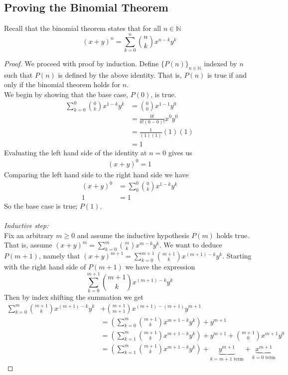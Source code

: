 \documentclass[11pt,reqno, tikz, border=3mm]{amsart}
\theoremstyle{plain}
\theoremstyle{definition}
\theoremstyle{remark}
\begin{document}
\subsection{Proving the Binomial Theorem} Recall that the binomial theorem states that for all $n \in \mathbb{N}$
$$(x+y)^n = \sum^n_{k=0}\binom{n}{k}x^{n-k}y^k$$
\begin{proof}
We proceed with proof by induction. Define $\{P(n)\}_{n\in \mathbb{N}}$ indexed by $n$ such that $P(n)$ is defined by the above identity. That is, $P(n)$ is true if and only if the binomial theorem holds for $n$. \\
We begin by showing that the base case, $P(0)$, is true. 
\begin{align}
\sum_{k=0}^0 \binom{0}{k} x^{1-k}y^k &= \binom{0}{0}x^{1-1}y^0 \\
&= \frac{0!}{0!(0-0)!} x^0 y^0 \\
&= \frac{1}{(1)(1)}(1)(1) \\
&= 1
\end{align}
Evaluating the left hand side of the identity at $n=0$ gives us
\begin{align}
(x+y)^0 = 1
\end{align}
Comparing the left hand side to the right hand side we have
\begin{align}
(x+y)^0 &= \sum^0_0\binom{0}{k}x^{1-k}y^k \\
1 &= 1
\end{align}
 So the base case is true; $P(1)$. \\ \\
\textit{Inductive step: }  \\
Fix an arbitrary $m \ge 0$ and assume the inductive hypothesis $P(m)$ holds true. That is, assume $(x+y)^m = \sum^m_{k=0}\binom{m}{k}x^{m-k}y^k$. We want to deduce $P(m+1)$, namely that $(x+y)^{m+1} = \sum^{m+1}_{k=0}\binom{m+1}{k}x^{(m+1)-k}y^k$. Starting with the right hand side of $P(m+1)$ we have the expression
$$\sum^{m+1}_{k=0}\binom{m+1}{k}x^{(m+1)-k}y^k$$
Then by index shifting the summation we get
\begin{align}
\sum^{m}_{k=0}\binom{m+1}{k}x^{(m+1)-k}y^k &+ \binom{m+1}{m+1}x^{(m+1)-(m+1)}y^{m+1} \\
&= \left(\sum^{m}_{k=0}\binom{m+1}{k}x^{m+1-k}y^k\right) + y^{m+1} \\
&= \left(\sum^{m}_{k=1}\binom{m+1}{k}x^{m+1-k}y^k\right) + y^{m+1} + \binom{m+1}{0}x^{m+1}y^{0} \\
&= \left(\sum^{m}_{k=1}\binom{m+1}{k}x^{m+1-k}y^k\right) + \underbrace{y^{m+1}}_{k=m+1\text{ term}} + \underbrace{x^{m+1}}_{k=0 \text{ term}}

\end{align}
\end{proof}
\end{document}
